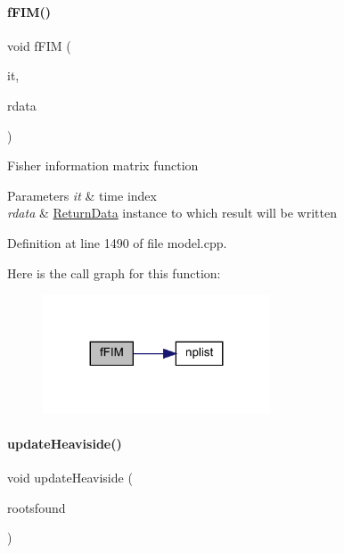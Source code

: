 \paragraph{\texorpdfstring{fFIM()}{fFIM()}}
{\footnotesize\ttfamily void f\+F\+IM (\begin{DoxyParamCaption}\item[{const int}]{it,  }\item[{\mbox{\hyperlink{classamici_1_1_return_data}{Return\+Data}} $\ast$}]{rdata }\end{DoxyParamCaption})}

Fisher information matrix function 
\begin{DoxyParams}{Parameters}
{\em it} & time index \\
\hline
{\em rdata} & \mbox{\hyperlink{classamici_1_1_return_data}{Return\+Data}} instance to which result will be written \\
\hline
\end{DoxyParams}


Definition at line 1490 of file model.\+cpp.

Here is the call graph for this function\+:
\nopagebreak
\begin{figure}[H]
\begin{center}
\leavevmode
\includegraphics[width=191pt]{classamici_1_1_model_aba7a1237e503813d9ec7ca56413f1e1d_cgraph}
\end{center}
\end{figure}
\mbox{\label{classamici_1_1_model_ae053072690046bd24225447de93a9e84}} 
\paragraph{\texorpdfstring{updateHeaviside()}{updateHeaviside()}}
{\footnotesize\ttfamily void update\+Heaviside (\begin{DoxyParamCaption}\item[{const std\+::vector$<$ int $>$ \&}]{rootsfound }\end{DoxyParamCaption})}

